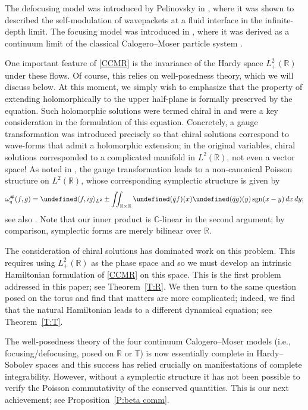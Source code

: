 \documentclass{amsart}
\numberwithin{equation}{section}
\theoremstyle{definition}
\newcommand{\om}{\omega}
\newcommand{\C}{\mathbb{C}}
\newcommand{\R}{\mathbb{R}}
\newcommand{\T}{\mathbb{T}}
\newcommand{\lan}{\langle}
\newcommand{\ran}{\rangle}
\DeclareMathOperator{\sgn}{sgn}
\let\Re=\undefined\DeclareMathOperator{\Re}{Re}
\begin{document}
The defocusing model was introduced by Pelinovsky in \cite{PELINOVSKY1995401}, where it was shown to described the self-modulation of wavepackets at a fluid interface in the infinite-depth limit.  The focusing model was introduced in \cite{ABANOV_BETTELHEIM_WIEGMANN}, where it was derived as a continuum limit of the classical Calogero--Moser particle system \cite{Calogero, MOSER1975197}.

One important feature of \eqref{CCMR} is the invariance of the Hardy space $L^2_+(\R)$ under these flows.  Of course, this relies on well-posedness theory, which we will discuss below. At this moment, we simply wish to emphasize that the property of extending holomorphically to the upper half-plane is formally preserved by the equation.  Such holomorphic solutions were termed chiral in \cite{ABANOV_BETTELHEIM_WIEGMANN} and were a key consideration in the formulation of this equation.  Concretely, a gauge transformation was introduced precisely so that chiral solutions correspond to wave-forms that admit a holomorphic extension; in the original variables, chiral solutions corresponded to a complicated manifold in $L^2(\R)$, not even a vector space!
As noted in \cite{ABANOV_BETTELHEIM_WIEGMANN}, the gauge transformation leads to a non-canonical Poisson structure on $L^2(\R)$, whose corresponding symplectic structure is given by
\begin{equation}\label{eqn:omega_hash}
\om_q^{\#}(f,g)=\Re\lan f, i g\ran_{L^2}\pm\iint_{\R\times\R}\Re(\bar{q}f)(x)\Re(\bar{q}g)(y)\sgn(x-y)\,dx\,dy;
\end{equation}
see also \cite{gerard2024calogero}.  Note that our inner product is $\C$-linear in the second argument; by comparison, symplectic forms are merely bilinear over $\R$.

The consideration of chiral solutions has dominated work on this problem.  This requires using $L^2_+(\R)$ as the phase space and so we must develop an intrinsic Hamiltonian formulation of \eqref{CCMR} on this space.  This is the first problem addressed in this paper; see Theorem~\ref{T:R}.  We then turn to the same question posed on the torus and find that matters are more complicated; indeed, we find that the natural Hamiltonian leads to a different dynamical equation; see Theorem~\ref{T:T}.

The well-posedness theory of the four continuum Calogero--Moser models (i.e., focusing/defocusing, posed on $\R$ or $\T$) is now essentially complete in Hardy--Sobolev spaces and this success has relied crucially on manifestations of complete integrability.  However, without a symplectic structure it has not been possible to verify the Poisson commutativity of the conserved quantities.  This is our next achievement; see Proposition~\ref{P:beta comm}.  
\end{document}
